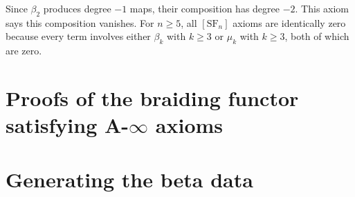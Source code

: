 \begin{remark}
  Since $\beta_2$ produces degree $-1$ maps, their composition has degree
  $-2$. This axiom says this composition vanishes. For $n \geq 5$, all $[\mathrm{SF}_n]$ axioms are
  identically zero because every term involves either $\beta_k$
  with $k \geq 3$ or $\mu_k$ with $k \geq 3$, both of which are zero.
\end{remark}

\begin{remark}

\end{remark}

\section{Proofs of the braiding functor satisfying A-\texorpdfstring{$\infty$}{infinity} axioms}

\section{Generating the beta data}
